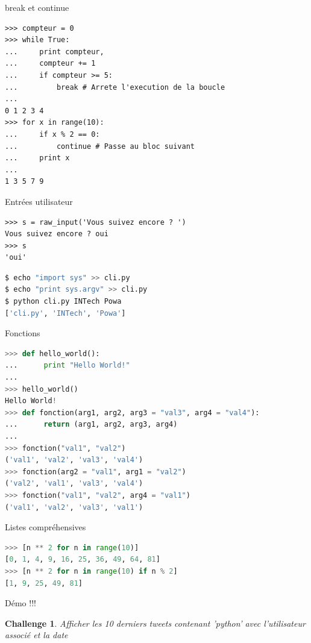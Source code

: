 \documentclass{beamer}
\begin{document}
\begin{frame}[fragile]{break et continue}
\begin{lstlisting}
>>> compteur = 0
>>> while True:
...     print compteur,
...     compteur += 1
...     if compteur >= 5:
...         break # Arrete l'execution de la boucle
...
0 1 2 3 4
>>> for x in range(10):
...     if x % 2 == 0:
...         continue # Passe au bloc suivant
...     print x
...
1 3 5 7 9
\end{lstlisting}
\end{frame}

\begin{frame}[fragile]{Entrées utilisateur}
\begin{lstlisting}
>>> s = raw_input('Vous suivez encore ? ')
Vous suivez encore ? oui
>>> s
'oui'
\end{lstlisting}

\begin{lstlisting}[language=bash]
$ echo "import sys" >> cli.py
$ echo "print sys.argv" >> cli.py
$ python cli.py INTech Powa
['cli.py', 'INTech', 'Powa']
\end{lstlisting}
\end{frame}

\begin{frame}[fragile]{Fonctions}
\begin{lstlisting}[language=python]
>>> def hello_world():
...      print "Hello World!"
... 
>>> hello_world()
Hello World!
>>> def fonction(arg1, arg2, arg3 = "val3", arg4 = "val4"):
...      return (arg1, arg2, arg3, arg4)
... 
>>> fonction("val1", "val2")
('val1', 'val2', 'val3', 'val4')
>>> fonction(arg2 = "val1", arg1 = "val2")
('val2', 'val1', 'val3', 'val4')
>>> fonction("val1", "val2", arg4 = "val1")
('val1', 'val2', 'val3', 'val1')
\end{lstlisting}
\end{frame}

\begin{frame}[fragile]{Listes compréhensives}
\begin{lstlisting}[language=python]
>>> [n ** 2 for n in range(10)]
[0, 1, 4, 9, 16, 25, 36, 49, 64, 81]
>>> [n ** 2 for n in range(10) if n % 2]
[1, 9, 25, 49, 81]
\end{lstlisting}
\end{frame}

\newtheorem{challenge}{Challenge}
\begin{frame}[fragile]{Démo !!!}
\begin{challenge}
Afficher les 10 derniers tweets contenant 'python' avec l'utilisateur associé et la date
\end{challenge}
\end{frame}
\end{document}
